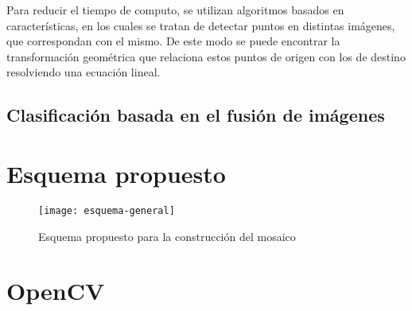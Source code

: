 Para reducir el tiempo de computo, se utilizan algoritmos basados en características, en los cuales se tratan de detectar puntos en distintas imágenes, que correspondan con el mismo. De este modo se puede encontrar la transformación geométrica que relaciona estos puntos de origen con los de destino resolviendo una ecuación lineal.


\subsection*{Clasificación basada en el fusión de imágenes}


\section{Esquema propuesto}

\begin{figure}[H]
	\centerline{
		\texttt{[image: esquema-general]}}
		\caption{Esquema propuesto para la construcción del mosaico}
	
	\label{imagen:esquema}
\end{figure}

\section{OpenCV}